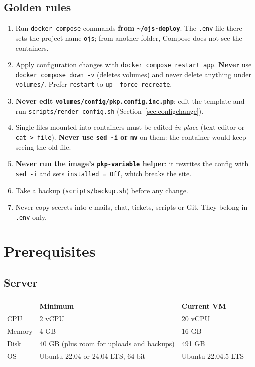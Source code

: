 \documentclass[11pt,a4paper]{report}
\newcommand{\code}[1]{\texttt{\small #1}}
\newcommand{\file}[1]{\texttt{\small #1}}
\begin{document}
\section{Golden rules}\label{sec:rules}
\begin{rulebox}
\begin{enumerate}[leftmargin=*]
  \item Run \code{docker compose} commands \textbf{from \file{\textasciitilde/ojs-deploy}}. The
        \file{.env} file there sets the project name \code{ojs}; from another folder, Compose
        does not see the containers.
  \item Apply configuration changes with \code{docker compose restart app}. \textbf{Never} use
        \code{docker compose down -v} (deletes volumes) and never delete anything under
        \file{volumes/}. Prefer \code{restart} to \code{up --force-recreate}.
  \item \textbf{Never edit \file{volumes/config/\allowbreak pkp.config.inc.php}}: edit the template and run
        \file{scripts/render-config.sh} (Section~\ref{sec:configchange}).
  \item Single files mounted into containers must be edited \emph{in place} (text editor or
        \code{cat > file}). \textbf{Never use \code{sed -i} or \code{mv}} on them: the container
        would keep seeing the old file.
  \item \textbf{Never run the image's \code{pkp-variable} helper}: it rewrites the config with
        \code{sed -i} and sets \code{installed = Off}, which breaks the site.
  \item Take a backup (\file{scripts/backup.sh}) before any change.
  \item Never copy secrets into e-mails, chat, tickets, scripts or Git. They belong in \file{.env} only.
\end{enumerate}
\end{rulebox}

\chapter{Prerequisites}\label{ch:prereq}

\section{Server}
\begin{tabularx}{\linewidth}{@{}lLL@{}}
\toprule
 & \textbf{Minimum} & \textbf{Current VM} \\
\midrule
CPU    & 2 vCPU   & 20 vCPU \\
Memory & 4 GB     & 16 GB \\
Disk   & 40 GB (plus room for uploads and backups) & 491 GB \\
OS     & Ubuntu 22.04 or 24.04 LTS, 64-bit & Ubuntu 22.04.5 LTS \\
\bottomrule
\end{tabularx}
\end{document}
